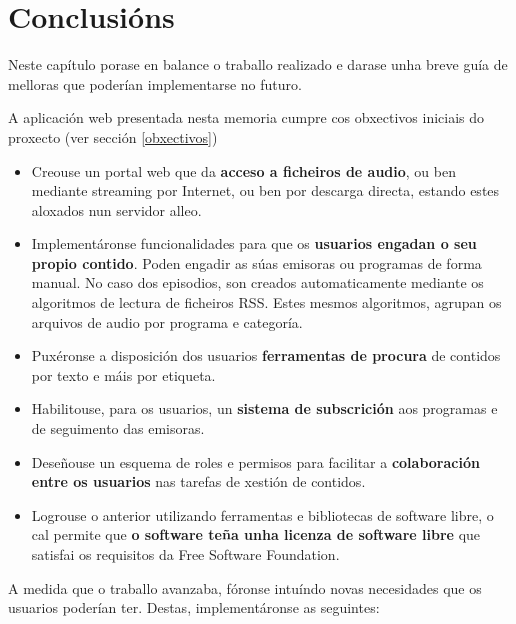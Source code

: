 \chapter[Conclusións]{
  \label{chp:conclusiones}
  Conclusións
}
\minitoc
\newpage

Neste capítulo porase en balance o traballo realizado e darase unha breve guía de melloras que poderían implementarse no futuro.

A aplicación web presentada nesta memoria cumpre cos obxectivos iniciais do proxecto (ver sección \ref{obxectivos}) 

\begin{itemize}
	\item Creouse un portal web que da \textbf{acceso a ficheiros de audio}, ou ben mediante streaming por Internet, ou ben por descarga directa, estando estes aloxados nun servidor alleo.
	\item Implementáronse funcionalidades para que os \textbf{usuarios engadan o seu propio contido}. Poden engadir as súas emisoras ou programas de forma manual. No caso dos episodios, son creados automaticamente mediante os algoritmos de lectura de ficheiros RSS. Estes mesmos algoritmos, agrupan os arquivos de audio por programa e categoría.
	\item Puxéronse a disposición dos usuarios \textbf{ferramentas de procura} de contidos por texto e máis por etiqueta. 
	\item Habilitouse, para os usuarios, un \textbf{sistema de subscrición} aos programas e de seguimento das emisoras.
	\item Deseñouse un esquema de roles e permisos para facilitar a \textbf{colaboración entre os usuarios} nas tarefas de xestión de contidos.
	\item Logrouse o anterior utilizando ferramentas e bibliotecas de software libre, o cal permite que \textbf{o software teña unha licenza de software libre} que satisfai os requisitos da Free Software Foundation.
\end{itemize}


A medida que o traballo avanzaba, fóronse intuíndo novas necesidades que os usuarios poderían ter. Destas, implementáronse as seguintes:

